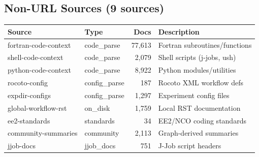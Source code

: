 \documentclass[11pt,letterpaper]{article}
\begin{document}
\subsection{Non-URL Sources (9 sources)}

\begin{longtable}{p{3.8cm}p{2.5cm}rp{4.5cm}}
\toprule
\textbf{Source} & \textbf{Type} & \textbf{Docs} & \textbf{Description} \\
\midrule
\endhead
fortran-code-context & code\_parse & 77,613 & Fortran subroutines/functions \\
shell-code-context & code\_parse & 2,079 & Shell scripts (j-jobs, ush) \\
python-code-context & code\_parse & 8,922 & Python modules/utilities \\
rocoto-config & config\_parse & 187 & Rocoto XML workflow defs \\
expdir-configs & config\_parse & 1,297 & Experiment config files \\
global-workflow-rst & on\_disk & 1,759 & Local RST documentation \\
ee2-standards & standards & 34 & EE2/NCO coding standards \\
community-summaries & community & 2,113 & Graph-derived summaries \\
jjob-docs & jjob\_docs & 751 & J-Job script headers \\
\bottomrule
\end{longtable}

\newpage
\printbibliography
\end{document}
